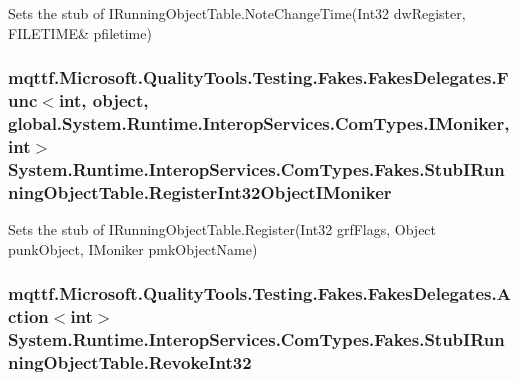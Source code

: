 Sets the stub of I\-Running\-Object\-Table.\-Note\-Change\-Time(Int32 dw\-Register, F\-I\-L\-E\-T\-I\-M\-E\& pfiletime)

\hypertarget{class_system_1_1_runtime_1_1_interop_services_1_1_com_types_1_1_fakes_1_1_stub_i_running_object_table_a579d8b96c5f1e11d347fdc68741338ff}{
\subsubsection[{Register\-Int32\-Object\-I\-Moniker}]{\setlength{\rightskip}{0pt plus 5cm}mqttf.\-Microsoft.\-Quality\-Tools.\-Testing.\-Fakes.\-Fakes\-Delegates.\-Func$<$int, object, global.\-System.\-Runtime.\-Interop\-Services.\-Com\-Types.\-I\-Moniker, int$>$ System.\-Runtime.\-Interop\-Services.\-Com\-Types.\-Fakes.\-Stub\-I\-Running\-Object\-Table.\-Register\-Int32\-Object\-I\-Moniker}}\label{class_system_1_1_runtime_1_1_interop_services_1_1_com_types_1_1_fakes_1_1_stub_i_running_object_table_a579d8b96c5f1e11d347fdc68741338ff}


Sets the stub of I\-Running\-Object\-Table.\-Register(\-Int32 grf\-Flags, Object punk\-Object, I\-Moniker pmk\-Object\-Name)

\hypertarget{class_system_1_1_runtime_1_1_interop_services_1_1_com_types_1_1_fakes_1_1_stub_i_running_object_table_a28b975aa79efb4ed127ad2b119cc44a1}{
\subsubsection[{Revoke\-Int32}]{\setlength{\rightskip}{0pt plus 5cm}mqttf.\-Microsoft.\-Quality\-Tools.\-Testing.\-Fakes.\-Fakes\-Delegates.\-Action$<$int$>$ System.\-Runtime.\-Interop\-Services.\-Com\-Types.\-Fakes.\-Stub\-I\-Running\-Object\-Table.\-Revoke\-Int32}}\label{class_system_1_1_runtime_1_1_interop_services_1_1_com_types_1_1_fakes_1_1_stub_i_running_object_table_a28b975aa79efb4ed127ad2b119cc44a1}


